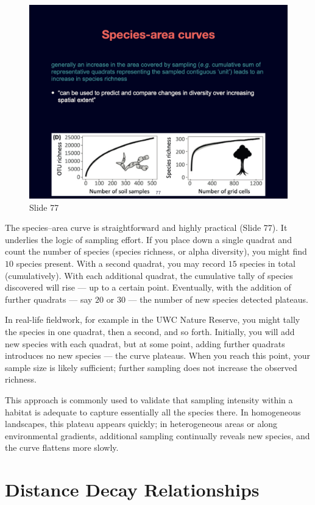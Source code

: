 \documentclass[
  10pt,
]{book}
\begin{document}
\begin{figure}[ht]
\centering
\includegraphics[width=0.8\linewidth]{../images/BDC334/BDC334-077.jpeg}
\caption*{Slide 77}
\end{figure}

The species--area curve is straightforward and highly practical (Slide
77). It underlies the logic of sampling effort. If you place down a
single quadrat and count the number of species (species richness, or
alpha diversity), you might find \(10\) species present. With a second
quadrat, you may record \(15\) species in total (cumulatively). With
each additional quadrat, the cumulative tally of species discovered will
rise --- up to a certain point. Eventually, with the addition of further
quadrats --- say \(20\) or \(30\) --- the number of new species detected
plateaus.

In real-life fieldwork, for example in the UWC Nature Reserve, you might
tally the species in one quadrat, then a second, and so forth.
Initially, you will add new species with each quadrat, but at some
point, adding further quadrats introduces no new species --- the curve
plateaus. When you reach this point, your sample size is likely
sufficient; further sampling does not increase the observed richness.

This approach is commonly used to validate that sampling intensity
within a habitat is adequate to capture essentially all the species
there. In homogeneous landscapes, this plateau appears quickly; in
heterogeneous areas or along environmental gradients, additional
sampling continually reveals new species, and the curve flattens more
slowly.

\section{Distance Decay
Relationships}\label{distance-decay-relationships}
\end{document}
